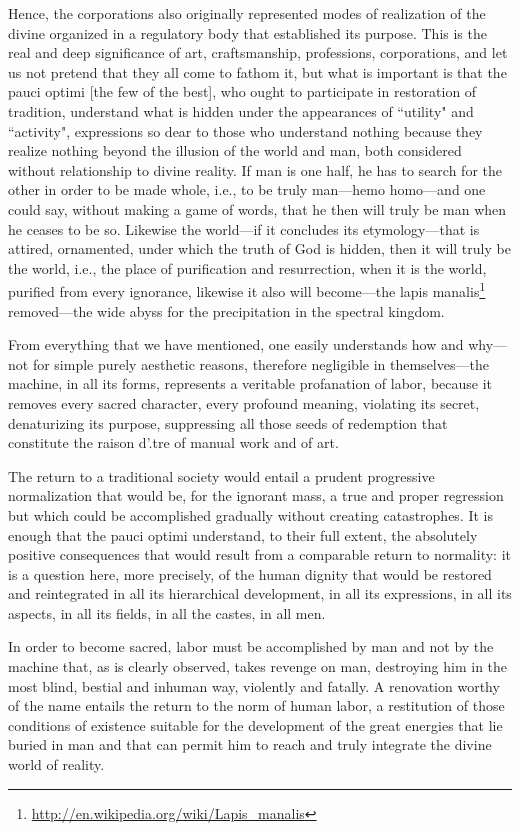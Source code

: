 Hence, the corporations also originally represented modes of realization of the divine organized in a regulatory body that established its purpose. This is the real and deep significance of art, craftsmanship, professions, corporations, and let us not pretend that they all come to fathom it, but what is important is that the pauci optimi [the few of the best], who ought to participate in restoration of tradition, understand what is hidden under the appearances of ``utility" and ``activity", expressions so dear to those who understand nothing because they realize nothing beyond the illusion of the world and man, both considered without relationship to divine reality. If man is one half, he has to search for the other in order to be made whole, i.e., to be truly man—hemo homo—and one could say, without making a game of words, that he then will truly be man when he ceases to be so. Likewise the world—if it concludes its etymology—that is attired, ornamented, under which the truth of God is hidden, then it will truly be the world, i.e., the place of purification and resurrection, when it is the world, purified from every ignorance, likewise it also will become—the lapis manalis\footnote{\url{http://en.wikipedia.org/wiki/Lapis_manalis}} removed—the wide abyss for the precipitation in the spectral kingdom.

From everything that we have mentioned, one easily understands how and why—not for simple purely aesthetic reasons, therefore negligible in themselves—the machine, in all its forms, represents a veritable profanation of labor, because it removes every sacred character, every profound meaning, violating its secret, denaturizing its purpose, suppressing all those seeds of redemption that constitute the raison d'.tre of manual work and of art.

The return to a traditional society would entail a prudent progressive normalization that would be, for the ignorant mass, a true and proper regression but which could be accomplished gradually without creating catastrophes. It is enough that the pauci optimi understand, to their full extent, the absolutely positive consequences that would result from a comparable return to normality: it is a question here, more precisely, of the human dignity that would be restored and reintegrated in all its hierarchical development, in all its expressions, in all its aspects, in all its fields, in all the castes, in all men.

In order to become sacred, labor must be accomplished by man and not by the machine that, as is clearly observed, takes revenge on man, destroying him in the most blind, bestial and inhuman way, violently and fatally. A renovation worthy of the name entails the return to the norm of human labor, a restitution of those conditions of existence suitable for the development of the great energies that lie buried in man and that can permit him to reach and truly integrate the divine world of reality.

